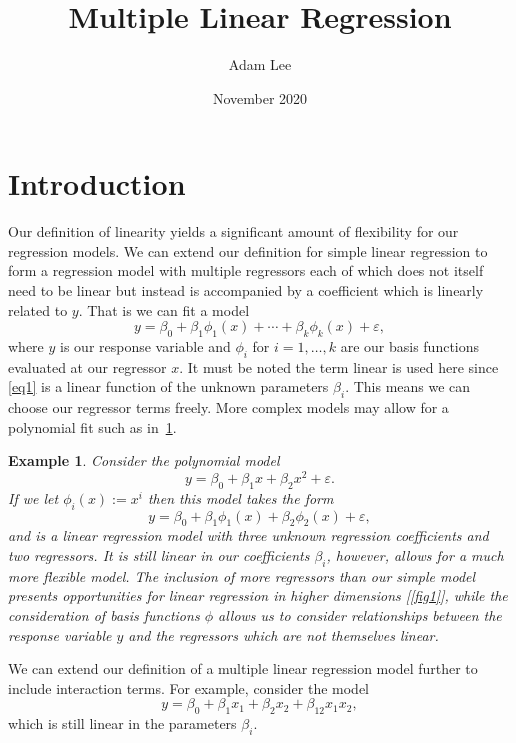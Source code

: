 \documentclass[10pt,a4paper, onecolumn, conference]{IEEEtran}
\author{Adam Lee}
\title{Multiple Linear Regression}
\date{November 2020}
\theoremstyle{own}
\newtheorem{example}{Example}
\theoremstyle{definition}
\theoremstyle{plain}
\begin{document}
\maketitle
\pagebreak
\section{Introduction}
Our definition of linearity yields a significant amount of flexibility for our regression models. We can extend our definition for simple linear regression to form a regression model with multiple regressors each of which does not itself need to be linear but instead is accompanied by a coefficient which is linearly related to $y$. That is we can fit a model
\begin{equation} \label{eq1}
y = \beta_0 + \beta_1 \phi_1(x) + \cdots + \beta_k \phi_k(x) + \varepsilon,
\end{equation}
where $y$ is our response variable and $\phi_i$ for $i = 1, \ldots, k$ are our basis functions evaluated at our regressor $x$. It must be noted the term linear is used here since \cref{eq1} is a linear function of the unknown parameters $\beta_i$. This means we can choose our regressor terms freely. More complex models may allow for a polynomial fit such as in~\cref{ex1}.
\begin{example} \label{ex1}
Consider the polynomial model
\begin{equation}
y = \beta_0 + \beta_1 x + \beta_2 x^2 + \varepsilon.
\end{equation}
If we let $\phi_i(x) := x^i$ then this model takes the form
\begin{equation}
y = \beta_0 + \beta_1 \phi_1(x) + \beta_2 \phi_2(x) + \varepsilon,
\end{equation}
and is a linear regression model with three unknown regression coefficients and two regressors. It is still linear in our coefficients $\beta_i$, however, allows for a much more flexible model. The inclusion of more regressors than our simple model presents opportunities for linear regression in higher dimensions [\ref{fig1}], while the consideration of basis functions $\phi$ allows us to consider relationships between the response variable $y$ and the regressors which are not themselves linear.
\end{example}

We can extend our definition of a multiple linear regression model further to include interaction terms. For example, consider the model
\begin{equation}
y = \beta_0 + \beta_1 x_1 + \beta_2 x_2 + \beta_{12} x_1 x_2,
\end{equation}
which is still linear in the parameters $\beta_i$.
\end{document}
